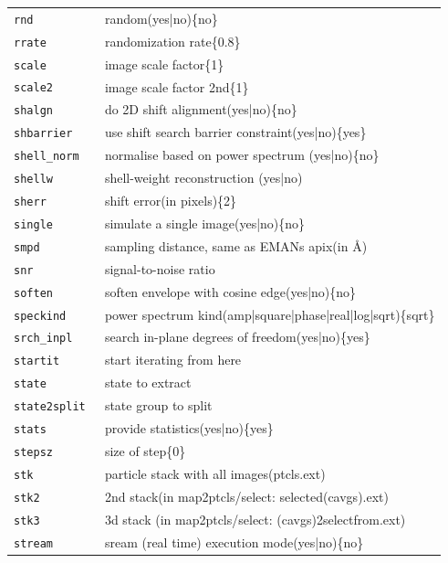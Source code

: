 \documentclass[a4paper,11pt]{article}
\begin{document}
\begin{tabular}{ll}
\texttt{rnd             }&{ random(yes|no)\{no\}}\\
\texttt{rrate           }&{ randomization rate\{0.8\}}\\
\texttt{scale           }&{ image scale factor\{1\}}\\
\texttt{scale2          }&{ image scale factor 2nd\{1\}}\\
\texttt{shalgn          }&{ do 2D shift alignment(yes|no)\{no\}}\\
\texttt{shbarrier       }&{ use shift search barrier constraint(yes|no)\{yes\}}\\
\texttt{shell\_norm      }&{ normalise based on power spectrum (yes|no)\{no\}}\\
\texttt{shellw          }&{ shell-weight reconstruction (yes|no)}\\
\texttt{sherr           }&{ shift error(in pixels)\{2\}}\\
\texttt{single          }&{ simulate a single image(yes|no)\{no\}}\\
\texttt{smpd            }&{ sampling distance, same as EMANs apix(in \AA{})}\\
\texttt{snr             }&{ signal-to-noise ratio}\\
\texttt{soften          }&{ soften envelope with cosine edge(yes|no)\{no\}}\\
\texttt{speckind        }&{ power spectrum kind(amp|square|phase|real|log|sqrt)\{sqrt\}}\\
\texttt{srch\_inpl       }&{ search in-plane degrees of freedom(yes|no)\{yes\}}\\
\texttt{startit         }&{ start iterating from here}\\
\texttt{state           }&{ state to extract}\\
\texttt{state2split     }&{ state group to split}\\
\texttt{stats           }&{ provide statistics(yes|no)\{yes\}}\\
\texttt{stepsz          }&{ size of step\{0\}}\\
\texttt{stk             }&{ particle stack with all images(ptcls.ext)}\\
\texttt{stk2            }&{ 2nd stack(in map2ptcls/select: selected(cavgs).ext)}\\
\texttt{stk3            }&{ 3d stack (in map2ptcls/select: (cavgs)2selectfrom.ext)}\\
\texttt{stream          }&{ sream (real time) execution mode(yes|no)\{no\}}\\

\end{tabular}
\end{document}
